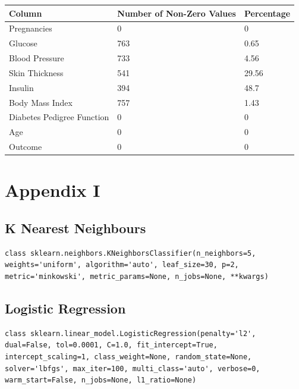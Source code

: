\documentclass[12pt]{article}
\begin{document}
{
\clearpage
\thispagestyle{empty}
\centering
\begin{table}[]
\centering
\begin{tabular}{|l|l|l|}
\hline
Column                     & Number of Non-Zero Values & Percentage \\ \hline
Pregnancies                & 0                         & 0          \\ \hline
Glucose                    & 763                       & 0.65       \\ \hline
Blood Pressure             & 733                       & 4.56       \\ \hline
Skin Thickness             & 541                       & 29.56      \\ \hline
Insulin                    & 394                       & 48.7       \\ \hline
Body Mass Index            & 757                       & 1.43       \\ \hline
Diabetes Pedigree Function & 0                         & 0          \\ \hline
Age                        & 0                         & 0          \\ \hline
Outcome                    & 0                         & 0          \\ \hline
\end{tabular}
\end{table}
\label{table:4}
\clearpage
}

\newpage
\section{Appendix I}
\subsection{K Nearest Neighbours}
\begin{lstlisting}
class sklearn.neighbors.KNeighborsClassifier(n_neighbors=5, weights='uniform', algorithm='auto', leaf_size=30, p=2, metric='minkowski', metric_params=None, n_jobs=None, **kwargs)
\end{lstlisting}

\subsection{Logistic Regression}
\begin{lstlisting}
class sklearn.linear_model.LogisticRegression(penalty='l2', dual=False, tol=0.0001, C=1.0, fit_intercept=True, intercept_scaling=1, class_weight=None, random_state=None, solver='lbfgs', max_iter=100, multi_class='auto', verbose=0, warm_start=False, n_jobs=None, l1_ratio=None)
\end{lstlisting}
\end{document}
